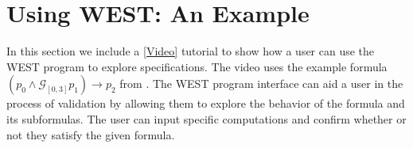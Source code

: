 \documentclass[runningheads]{llncs}
\begin{document}

\section{Using WEST: An Example}\label{Using WEST}
In this section we include a \href{https://youtu.be/HoBJwdCq42c}{[Video]} tutorial to show how a user can use the WEST program to explore specifications. The video uses the example formula $(p_0 \land \mathcal{G}_{[0,3]}p_1) \rightarrow p_2$ from \cite{KZJZR20}. The WEST program interface can aid a user in the process of validation by allowing them to explore the behavior of the formula and its subformulas. The user can input specific computations and confirm whether or not they satisfy the given formula.

\end{document}
